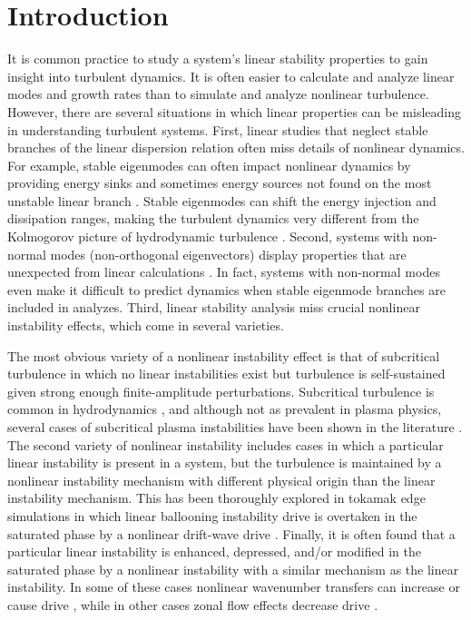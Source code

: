 \documentclass[showpacs,preprintnumbers,amsmath,amssymb,superscriptaddress]{revtex4}
\begin{document}
\section{Introduction}
It is common practice to study a system's linear stability properties to gain insight into turbulent dynamics. It is often easier to calculate and analyze linear modes and growth rates than
to simulate and analyze nonlinear turbulence. However, there are several situations in which linear properties can be misleading in understanding turbulent systems. First,
linear studies that neglect stable branches of the linear dispersion relation often miss details of nonlinear dynamics. For example, stable eigenmodes can often
impact nonlinear dynamics by providing energy sinks and sometimes energy sources not found on the most unstable linear branch
\cite{baver2002,terry2002,terry2006a,terry2006b,gatto2006,terry2009,hatch2009,kim2010,makwana2011,hatch2011}. Stable eigenmodes can shift
the energy injection and dissipation ranges, making the turbulent dynamics very different from the Kolmogorov picture of hydrodynamic turbulence \cite{Kolmogorov1941}.
Second, systems with non-normal modes (non-orthogonal eigenvectors) display properties that are unexpected from linear calculations \cite{kim2010,camargo1998}. 
In fact, systems with non-normal modes even make it difficult to predict dynamics
when stable eigenmode branches are included in analyzes. Third, linear stability analysis miss crucial nonlinear instability effects, which come in several varieties. 

The most obvious variety of a nonlinear instability effect is that of subcritical turbulence in which no linear instabilities exist but turbulence is self-sustained 
given strong enough finite-amplitude perturbations. Subcritical turbulence is common in hydrodynamics \cite{manneville2008}, and although not as prevalent in plasma physics,
several cases of subcritical plasma instabilities have been shown in the literature \cite{scott1990,scott1992,drake1995,nordman1993,waltz1985,itoh1996}.
The second variety of nonlinear instability includes cases in which a particular linear instability is present in a system, but the turbulence is maintained
by a nonlinear instability mechanism with different physical origin than the linear instability mechanism. This has been thoroughly explored in tokamak edge simulations in which
linear ballooning instability drive is overtaken in the saturated phase by a nonlinear drift-wave drive \cite{zeiler1996,zeiler1997,scott2002,scott2003,scott2005}.
Finally, it is often found that a particular linear instability is enhanced, depressed, and/or  modified in the saturated phase by a nonlinear instability with a similar mechanism 
as the linear instability. In some of these cases nonlinear wavenumber transfers can increase or cause drive \cite{biskamp1995,korsholm1999}, while in other cases zonal flow effects
decrease drive \cite{dimits2000,ernst2004}. 
\end{document}
